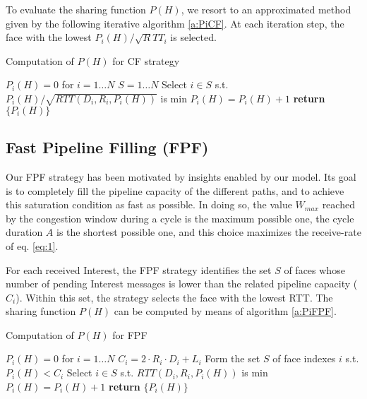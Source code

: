 \documentclass{sig-alternate-10pt}
\begin{document}
To evaluate the sharing function $P(H)$, we resort to an approximated method given by the following iterative algorithm \ref{a:PiCF}. At each iteration step, the face with the lowest $P_i(H)/\sqrt RTT_i$ is selected.




\begin{algorithm}
\caption{Computation of $P(H)$ for CF strategy}
\label{a:PiCF}
\begin{algorithmic}[1]
\State $P_i(H) = 0$ for $i = 1 \dots N$
\State $S = 1 \dots N$
\State Select $i \in S$ s.t.
\State $P_i(H) / \sqrt{RTT(D_i,R_i,P_i(H))}$ is min
\State $P_i(H) = P_i(H) + 1$
\EndFor
\State \textbf{return} $\{P_i(H)\}$
\EndProcedure
\end{algorithmic}
\end{algorithm}

\subsection{Fast Pipeline Filling (FPF)}
Our FPF strategy has been motivated by insights enabled by our model. Its goal is to completely fill the pipeline capacity of the different paths, and to achieve this saturation condition as fast as possible. In doing so, the value $W_{max}$ reached by the congestion window during a cycle is the maximum possible one, the cycle duration $A$ is the shortest possible one, and this choice maximizes the receive-rate of eq. \ref{eq:1}.

For each received Interest, the FPF strategy identifies the set $S$ of faces whose number of pending Interest messages is lower than the related pipeline capacity ($C_i$). Within this set, the strategy selects the face with the lowest RTT. The sharing function $P(H)$ can be computed by means of algorithm \ref{a:PiFPF}.

\begin{algorithm}
\caption{Computation of $P(H)$ for FPF }
\label{a:PiFPF}
\begin{algorithmic}[1]
\State $P_i(H) = 0$ for $i = 1 \dots N$
\State $C_i = 2 \cdot R_i \cdot D_i+L_i$
\State Form the set $S$ of face indexes $i$ s.t. $P_i(H) < C_i$
\State Select $i \in S$ s.t. $RTT(D_i,R_i,P_i(H))$ is min
\State $P_i(H) = P_i(H) + 1$
\EndFor
\State \textbf{return} $\{P_i(H)\}$
\EndProcedure
\end{algorithmic}
\end{algorithm}
\end{document}
